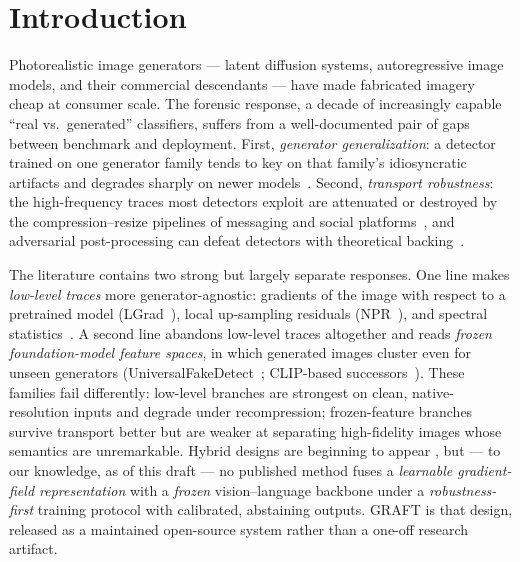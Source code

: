 \documentclass[10pt,twocolumn]{article}
\begin{document}
\section{Introduction}
Photorealistic image generators --- latent diffusion systems, autoregressive
image models, and their commercial descendants --- have made fabricated
imagery cheap at consumer scale. The forensic response, a decade of
increasingly capable ``real vs.\ generated'' classifiers, suffers from a
well-documented pair of gaps between benchmark and deployment. First,
\emph{generator generalization}: a detector trained on one generator family
tends to key on that family's idiosyncratic artifacts and degrades sharply on
newer models~\cite{wang2020cnn,gragnaniello2021gan,zhu2023genimage}. Second,
\emph{transport robustness}: the high-frequency traces most detectors exploit
are attenuated or destroyed by the compression--resize pipelines of messaging
and social platforms~\cite{gragnaniello2021gan,corvi2023detection}, and
adversarial post-processing can defeat detectors with theoretical
backing~\cite{saberi2024robustness}.

The literature contains two strong but largely separate responses. One line
makes \emph{low-level traces} more generator-agnostic: gradients of the image
with respect to a pretrained model (LGrad~\cite{tan2023lgrad}), local
up-sampling residuals (NPR~\cite{tan2024npr}), and spectral
statistics~\cite{durall2020watch,frank2020leveraging}. A second line abandons
low-level traces altogether and reads \emph{frozen foundation-model feature
spaces}, in which generated images cluster even for unseen generators
(UniversalFakeDetect~\cite{ojha2023universal}; CLIP-based
successors~\cite{cozzolino2024raising,liu2024fatformer}). These families fail
differently: low-level branches are strongest on clean, native-resolution
inputs and degrade under recompression; frozen-feature branches survive
transport better but are weaker at separating high-fidelity images whose
semantics are unremarkable. Hybrid designs are beginning to appear
\cite{yan2025sanity}, but --- to our knowledge, as of this draft --- no
published method fuses a \emph{learnable gradient-field representation} with
a \emph{frozen} vision--language backbone under a \emph{robustness-first}
training protocol with calibrated, abstaining outputs. GRAFT is that design,
released as a maintained open-source system rather than a one-off research
artifact.
\end{document}
